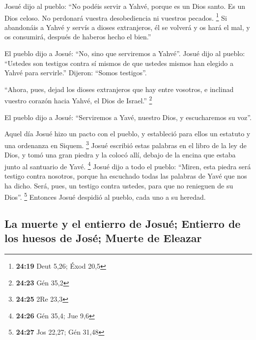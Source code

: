 \begin{paracol}{2}
 Josué dijo al pueblo: ``No podéis servir a Yahvé, porque
es un Dios santo. Es un Dios celoso. No perdonará vuestra desobediencia
ni vuestros pecados. \footnote{\textbf{24:19} Deut 5,26; Éxod 20,5}
 Si abandonáis a Yahvé y servís a dioses extranjeros, él
se volverá y os hará el mal, y os consumirá, después de haberos hecho el
bien.''

 El pueblo dijo a Josué: ``No, sino que serviremos a
Yahvé''.  Josué dijo al pueblo: ``Ustedes son testigos
contra sí mismos de que ustedes mismos han elegido a Yahvé para
servirle.'' Dijeron: ``Somos testigos''.

 ``Ahora, pues, dejad los dioses extranjeros que hay
entre vosotros, e inclinad vuestro corazón hacia Yahvé, el Dios de
Israel.'' \footnote{\textbf{24:23} Gén 35,2}

 El pueblo dijo a Josué: ``Serviremos a Yavé, nuestro
Dios, y escucharemos su voz''.

 Aquel día Josué hizo un pacto con el pueblo, y
estableció para ellos un estatuto y una ordenanza en Siquem. \footnote{\textbf{24:25}
  2Re 23,3}  Josué escribió estas palabras en el libro de
la ley de Dios, y tomó una gran piedra y la colocó allí, debajo de la
encina que estaba junto al santuario de Yavé. \footnote{\textbf{24:26}
  Gén 35,4; Jue 9,6}  Josué dijo a todo el pueblo:
``Miren, esta piedra será testigo contra nosotros, porque ha escuchado
todas las palabras de Yavé que nos ha dicho. Será, pues, un testigo
contra ustedes, para que no renieguen de su Dios''. \footnote{\textbf{24:27}
  Jos 22,27; Gén 31,48}  Entonces Josué despidió al
pueblo, cada uno a su heredad.

\hypertarget{la-muerte-y-el-entierro-de-josuuxe9-entierro-de-los-huesos-de-josuxe9-muerte-de-eleazar}{%
\subsection{La muerte y el entierro de Josué; Entierro de los huesos de
José; Muerte de
Eleazar}\label{la-muerte-y-el-entierro-de-josuuxe9-entierro-de-los-huesos-de-josuxe9-muerte-de-eleazar}}


\end{paracol}
